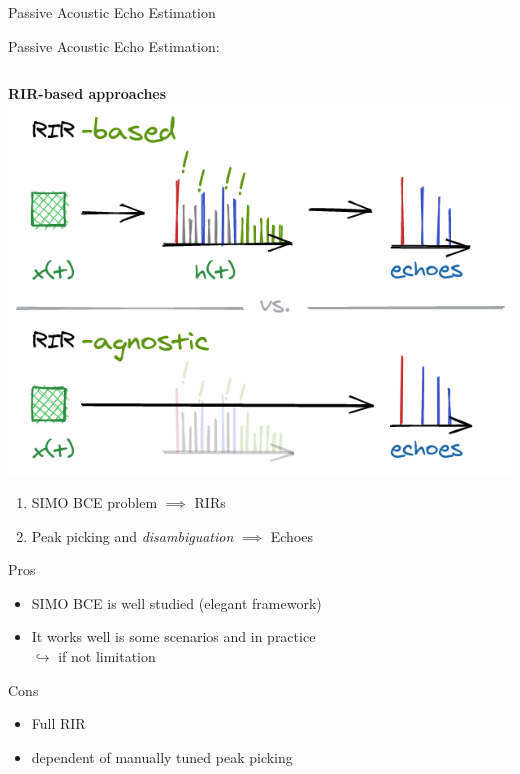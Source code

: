 \begin{frame}{Passive Acoustic Echo Estimation}

    \begin{block}{\alert{Passive} Acoustic Echo Estimation:}

        \vspace{1em}
        \small
        \begin{columns}[T,onlytextwidth] %
            \begin{column}{.48\textwidth}
                \textbf{RIR-\alert{based} approaches}
                \includegraphics[trim={0 31em 0 7em},clip,width=.9\textwidth]{./figures/based-agnostic.png}
                \begin{enumerate}
                    \item SIMO BCE problem $\implies$ RIRs
                    \item Peak picking and \textit{disambiguation} $\implies$ Echoes
                \end{enumerate}
                Pros
                \begin{itemize}
                    \item SIMO BCE is well studied (elegant framework)
                    \item It works well is some scenarios and in practice
                    \\$\hookrightarrow$ if not limitation
                \end{itemize}
                Cons
                \begin{itemize}
                    \item Full RIR
                    \item dependent of manually tuned peak picking

\end{itemize}
\end{column}
\end{columns}
\end{block}
\end{frame}

